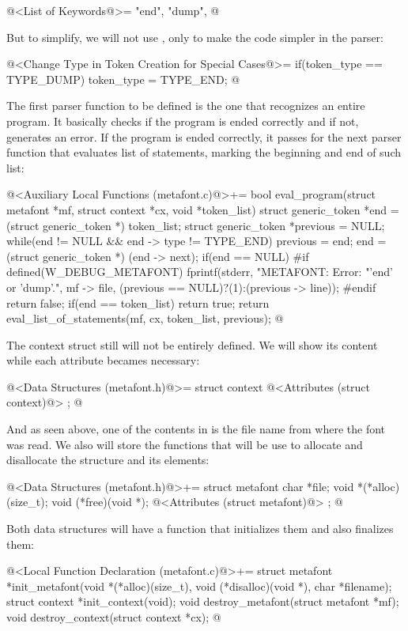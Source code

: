\iniciocodigo
@<List of Keywords@>=
"end", "dump",
@
\fimcodigo

But to simplify, we will not use ,
only  to make the code simpler in the parser:

\iniciocodigo
@<Change Type in Token Creation for Special Cases@>=
if(token_type == TYPE_DUMP)
  token_type = TYPE_END;
@
\fimcodigo


The first parser function to be defined is the one that recognizes an
entire program. It basically checks if the program is ended correctly
and if not, generates an error. If the program is ended correctly, it
passes for the next parser function that evaluates list of statements,
marking the beginning and end of such list:

\iniciocodigo
@<Auxiliary Local Functions (metafont.c)@>+=
bool eval_program(struct metafont *mf, struct context *cx,
                  void *token_list){
  struct generic_token *end = (struct generic_token *) token_list;
  struct generic_token *previous = NULL;
  while(end != NULL && end -> type != TYPE_END){
    previous = end;
    end = (struct generic_token *) (end -> next);
  }
  if(end == NULL){
#if defined(W_DEBUG_METAFONT)
    fprintf(stderr, "METAFONT: Error: %
                    "'end' or 'dump'.\n", mf -> file,
                    (previous == NULL)?(1):(previous -> line));
#endif
    return false;
  }
  if(end == token_list)
    return true;
  return eval_list_of_statements(mf, cx, token_list, previous);
}
@
\fimcodigo

The context struct still will not be entirely defined. We will show
its content while each attribute becames necessary:

\iniciocodigo
@<Data Structures (metafont.h)@>=
struct context{
  @<Attributes (struct context)@>
};
@
\fimcodigo


And as seen above, one of the contents in 
is the file name from where the font was read. We also will store the
functions that will be use to allocate and disallocate the structure
and its elements:

\iniciocodigo
@<Data Structures (metafont.h)@>+=
struct metafont{
  char *file;
  void *(*alloc)(size_t);
  void (*free)(void *);
  @<Attributes (struct metafont)@>
};
@
\fimcodigo

Both data structures will have a function that initializes them and
also finalizes them:

\iniciocodigo
@<Local Function Declaration (metafont.c)@>+=
struct metafont *init_metafont(void *(*alloc)(size_t),
                              void (*disalloc)(void *),
                              char *filename);
struct context *init_context(void);
void destroy_metafont(struct metafont *mf);
void destroy_context(struct context *cx);
@
\fimcodigo

